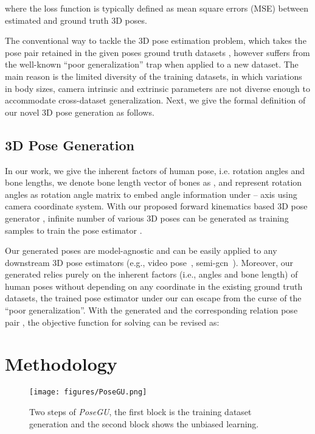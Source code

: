 \documentclass[runningheads]{llncs}
\begin{document}
where the loss function  is typically defined as mean square errors (MSE) between estimated and ground truth 3D poses. 

The conventional way to tackle the 3D pose estimation problem, which takes the pose pair  retained in the given  poses ground truth datasets , however suffers from the well-known ``poor generalization'' trap when applied to a new dataset. 
The main reason is the limited diversity of the training datasets, in which variations in body sizes, camera intrinsic and extrinsic parameters are not diverse enough to accommodate cross-dataset generalization. 
Next, we give the formal definition of our novel 3D pose generation as follows.

\subsection{3D Pose Generation}
In our work, we give the inherent factors of human pose, i.e. rotation angles and bone lengths, we denote bone length vector of  bones as , and represent rotation angles as rotation angle matrix  to embed angle information under -- axis using camera coordinate system. 
With our proposed forward kinematics based 3D pose generator , infinite number of various 3D poses  can be generated as training samples to train the pose estimator . 

Our generated poses are model-agnostic and can be easily applied to any downstream 3D pose estimators (e.g., video pose~\cite{videopose}, semi-gcn~\cite{semigcn}). Moreover, our generated  relies purely on the inherent factors (i.e., angles and bone length) of human poses without depending on any coordinate in the existing ground truth datasets, the trained pose estimator  under our  can escape from the curse of the ``poor generalization''. With the generated  and the corresponding relation pose pair , the objective function for solving  can be revised as:



\section{Methodology}\label{method} 

\begin{figure}[h]
    \centering
    \texttt{[image: figures/PoseGU.png]}
    \caption{Two steps of \textit{PoseGU}, the first block is the training dataset generation and the second block shows the unbiased learning.}
    \label{fig:posegu}
\end{figure}
\end{document}
